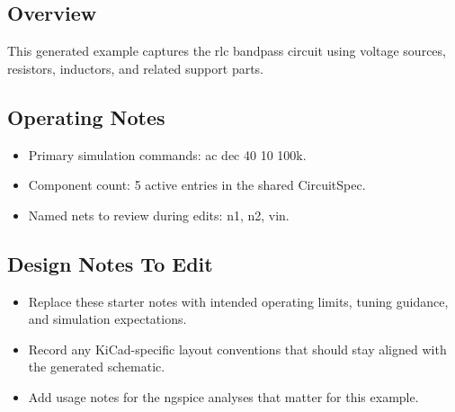 \subsection*{Overview}
This generated example captures the rlc bandpass circuit using voltage sources, resistors, inductors, and related support parts.

\subsection*{Operating Notes}
\begin{itemize}
  \item Primary simulation commands: ac dec 40 10 100k.
  \item Component count: 5 active entries in the shared CircuitSpec.
  \item Named nets to review during edits: n1, n2, vin.
\end{itemize}
\subsection*{Design Notes To Edit}
\begin{itemize}
  \item Replace these starter notes with intended operating limits, tuning guidance, and simulation expectations.
  \item Record any KiCad-specific layout conventions that should stay aligned with the generated schematic.
  \item Add usage notes for the ngspice analyses that matter for this example.
\end{itemize}
